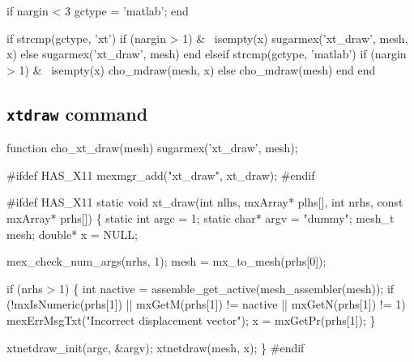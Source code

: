 if nargin < 3
  gctype = 'matlab';
end

if strcmp(gctype, 'xt')
  if (nargin > 1) & ~isempty(x)
    sugarmex('xt_draw', mesh, x)    
  else
    sugarmex('xt_draw', mesh)
  end
elseif strcmp(gctype, 'matlab')
  if (nargin > 1) & ~isempty(x)
    cho_mdraw(mesh, x)
  else
    cho_mdraw(mesh)
  end
end
\nwendcode{}\nwdocspar


\subsection{{\tt{}xt{}draw} command}

\nwenddocs{}\endmoddef
function cho_xt_draw(mesh)
sugarmex('xt_draw', mesh);
\nwendcode{}\nwdocspar

\nwenddocs{}\endmoddef
#ifdef HAS_X11
mexmgr_add("xt_draw", xt_draw);
#endif
\nwendcode{}\nwdocspar

\nwenddocs{}\endmoddef
#ifdef HAS_X11
static void xt_draw(int nlhs, mxArray* plhs[],
                    int nrhs, const mxArray* prhs[])
\{
    static int   argc = 1;
    static char* argv = "dummy";
    mesh_t mesh;
    double* x = NULL;

    mex_check_num_args(nrhs, 1);
    mesh = mx_to_mesh(prhs[0]);

    if (nrhs > 1) \{
        int nactive = assemble_get_active(mesh_assembler(mesh));
        if (!mxIsNumeric(prhs[1]) || 
                mxGetM(prhs[1]) != nactive || mxGetN(prhs[1]) != 1)
            mexErrMsgTxt("Incorrect displacement vector");
        x = mxGetPr(prhs[1]);
    \}

    xtnetdraw_init(argc, &argv);
    xtnetdraw(mesh, x);
\}
#endif

\nwendcode{}\nwdocspar



